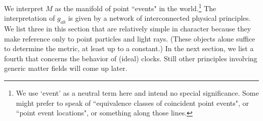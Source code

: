 \documentclass [12] {article}
\theoremstyle{plain}
\numberwithin{figure}{subsection}
\numberwithin{proposition}{subsection}
\begin{document}
We interpret $M$ as the manifold of point ``events" in the world.\footnote{We use `event' as a neutral term here and intend no special significance.   Some might prefer to speak of ``equivalence classes of coincident point events",
or  ``point event locations", or something along those lines.}  The interpretation of $g_{ab}$ is given by a network of interconnected physical principles. We list three in this section that are relatively simple in character because they make reference only to point particles and light rays. (These objects alone suffice to determine the metric, at least up to a constant.) In the next section, we list a fourth that concerns the behavior of (ideal) clocks. Still other principles involving generic matter fields will come up later.     
%
 
\end{document}

